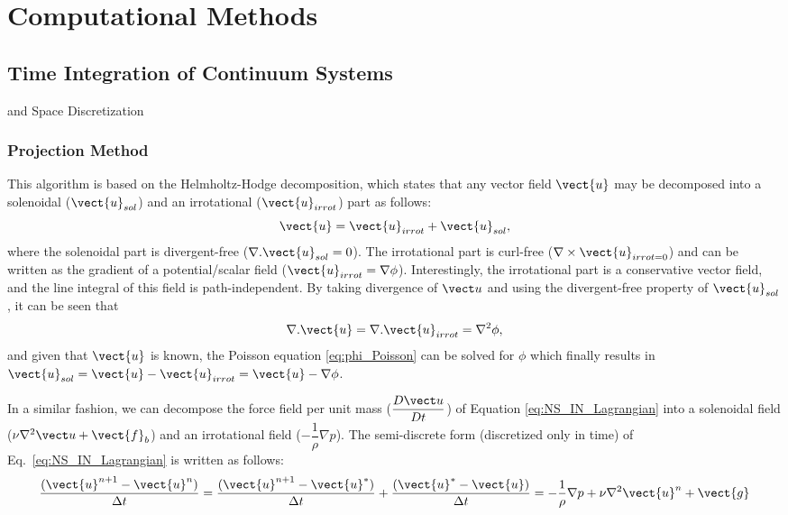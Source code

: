 \chapter{Computational Methods}
\label{chap:NumSolAspects}
\section{Time Integration of Continuum Systems}
and Space Discretization
\subsection{Projection Method}
This algorithm is based on the Helmholtz-Hodge decomposition, which states that any vector field $\vect{u}$ may be decomposed into a  solenoidal ($\vect{u}_{sol}$) and an irrotational ($\vect{u}_{irrot}$) part as follows:
\begin{equation}
\vect{u}=\vect{u}_{irrot}+\vect{u}_{sol},
\end{equation}
where the solenoidal part is divergent-free ($\nabla. \vect{u}_{sol}=0$). The irrotational part is curl-free ($\nabla \times \vect{u}_{irrot=0}$) and can be written as the gradient of a potential/scalar field ($\vect{u}_{irrot}=\nabla \phi$). Interestingly, the irrotational part is a conservative vector field, and the line integral of this field is path-independent.   
By taking divergence of $\vect u$ and using the divergent-free property of $\vect{u}_{sol}$, it can be seen that 
\begin{equation}\label{eq:phi_Poisson}
\nabla . \vect{u}=\nabla .\vect{u}_{irrot}= \nabla^2 \phi,
\end{equation}
and given that $\vect{u}$ is known, the Poisson equation \ref{eq:phi_Poisson} can be solved for $\phi$ which finally results in $\vect{u}_{sol}=\vect{u} -\vect{u}_{irrot}=\vect{u}-\nabla \phi$.

In a similar fashion, we can decompose the force field per unit mass ($\dfrac{D{\vect u}}{Dt}$)  of Equation \ref{eq:NS_IN_Lagrangian} into a solenoidal field ($ \nu \nabla^{2} {\vect u}+{\vect{f}_b}$) and an irrotational field ($-\dfrac{1}{\rho} \nabla p$). The semi-discrete form (discretized only in time) of Eq.~\ref{eq:NS_IN_Lagrangian} is written as follows:
\begin{equation}
\dfrac{(\vect{u}^{n+1}-\vect{u}^n)}{\Delta t}= \dfrac{(\vect{u}^{n+1}-\vect{u}^*)}{\Delta t} +\dfrac{(\vect{u}^{*}-\vect{u})}{\Delta t} = -\dfrac{1}{\rho} \nabla p +\nu \nabla^2\vect{u}^n + \vect{g}
\end{equation}

